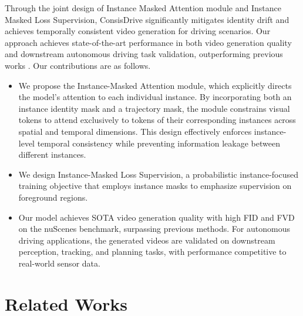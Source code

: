 \documentclass{article} %
\begin{document}
Through the joint design of Instance Masked Attention module and Instance Masked Loss Supervision, ConsisDrive significantly mitigates identity drift and achieves temporally consistent video generation for driving scenarios.
Our approach achieves state-of-the-art performance in both video generation quality and downstream autonomous driving task validation, outperforming previous works \cite{gao2024magicdrivedithighresolutionlongvideo, drivedreamer2, li2023drivingdiffusionlayoutguidedmultiviewdriving, wen2024panacea}.  
Our contributions are as follows.
\begin{itemize}

    \item We propose the Instance-Masked Attention module, which explicitly directs the model’s attention to each individual instance.
    By incorporating both an instance identity mask and a trajectory mask, the module constrains visual tokens to attend exclusively to tokens of their corresponding instances across spatial and temporal dimensions.
    This design effectively enforces instance-level temporal consistency while preventing information leakage between different instances.
    
    \item We design Instance-Masked Loss Supervision, a probabilistic instance-focused training objective that employs instance masks to emphasize supervision on foreground regions.
    
    \item Our model achieves SOTA video generation quality with high FID and FVD on the nuScenes benchmark, surpassing previous methods. For autonomous driving applications, the generated videos are validated on downstream perception, tracking, and planning tasks, with performance competitive to real-world sensor data.
\end{itemize}








\section{Related Works}
\label{sec:related}
\end{document}
